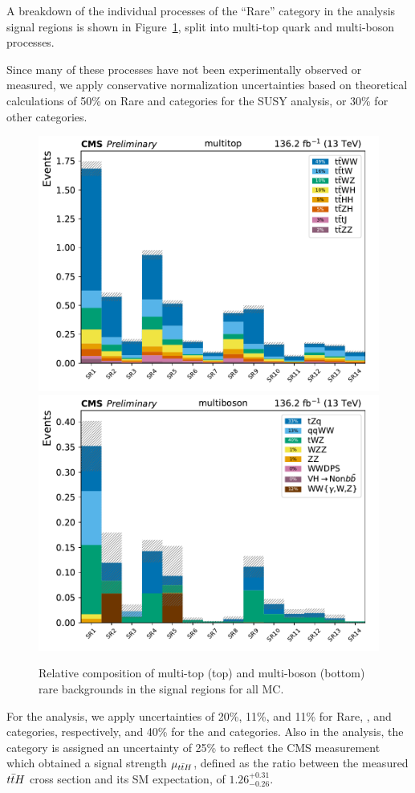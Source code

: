 A breakdown of the individual processes of the ``Rare'' category in the 
\smft analysis signal regions
is shown in Figure~\ref{fig:ftraressr}, split into multi-top quark and multi-boson
processes.

Since many of these processes have not been experimentally observed or measured,
we apply conservative normalization uncertainties based on theoretical calculations of 50\% on
Rare and \Xgamma categories for the SUSY analysis, or 30\% for other categories.

\begin{figure}[!hbtp]
    \centering
    \includegraphics[width=.60\textwidth]{figs/ftan/h_multitop.pdf} \\
    \includegraphics[width=.60\textwidth]{figs/ftan/h_multiboson.pdf}
    \caption{ Relative composition of multi-top (top) and multi-boson (bottom) rare backgrounds in the signal regions for all MC.}
    \label{fig:ftraressr}
\end{figure}

For the \smft analysis,
we apply uncertainties of 20\%, 11\%, and 11\% for Rare, \Xgamma, and \ttVV categories,
respectively, and 40\% for the \ttW and \ttZ categories. Also in the \smft analysis,
the \ttH category is assigned an uncertainty of 25\% to reflect the CMS \ttH 
measurement~\cite{CMS:Sirunyan2018hoz} which obtained a signal strength $\mu_{t\bar{t}H}$, defined
as the ratio between the measured $t\bar{t}H$ cross section and its SM expectation,
of $1.26^{+0.31}_{-0.26}$.

